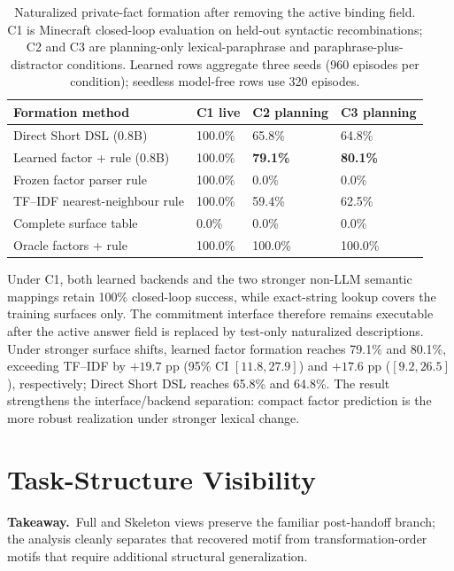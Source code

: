\documentclass[10pt]{article}
\newcommand{\tabstyle}{\small\setlength{\tabcolsep}{2.5pt}\renewcommand{\arraystretch}{1.10}}
\newcommand{\thead}[1]{\textbf{#1}}
\newcommand{\takeaway}[1]{\par\smallskip\noindent\textcolor{GCNavy}{\textbf{Takeaway.}}~#1\par\smallskip}
\begin{document}
\begin{table}[!htbp]
  \centering
  \caption{Naturalized private-fact formation after removing the active binding field. C1 is Minecraft closed-loop evaluation on held-out syntactic recombinations; C2 and C3 are planning-only lexical-paraphrase and paraphrase-plus-distractor conditions. Learned rows aggregate three seeds (960 episodes per condition); seedless model-free rows use 320 episodes.}
  \label{tab:naturalized-private}
  \tabstyle
  \begin{tabularx}{\textwidth}{Z R{2.15cm} R{2.15cm} R{2.15cm}}
    \toprule
    \thead{Formation method} & \thead{C1 live} & \thead{C2 planning} & \thead{C3 planning} \\
    \midrule
    Direct Short DSL (0.8B) & 100.0\% & 65.8\% & 64.8\% \\
    Learned factor + rule (0.8B) & 100.0\% & \textbf{79.1\%} & \textbf{80.1\%} \\
    Frozen factor parser rule & 100.0\% & 0.0\% & 0.0\% \\
    TF--IDF nearest-neighbour rule & 100.0\% & 59.4\% & 62.5\% \\
    Complete surface table & 0.0\% & 0.0\% & 0.0\% \\
    Oracle factors + rule & 100.0\% & 100.0\% & 100.0\% \\
    \bottomrule
  \end{tabularx}
\end{table}

Under C1, both learned backends and the two stronger non-LLM semantic mappings retain 100\% closed-loop success, while exact-string lookup covers the training surfaces only. The commitment interface therefore remains executable after the active answer field is replaced by test-only naturalized descriptions. Under stronger surface shifts, learned factor formation reaches 79.1\% and 80.1\%, exceeding TF--IDF by $+19.7$ pp (95\% CI $[11.8,27.9]$) and $+17.6$ pp ($[9.2,26.5]$), respectively; Direct Short DSL reaches 65.8\% and 64.8\%. The result strengthens the interface/backend separation: compact factor prediction is the more robust realization under stronger lexical change.

\section{Task-Structure Visibility}
\label{sec:supp-visibility}

\takeaway{Full and Skeleton views preserve the familiar post-handoff branch; the analysis cleanly separates that recovered motif from transformation-order motifs that require additional structural generalization.}
\end{document}
